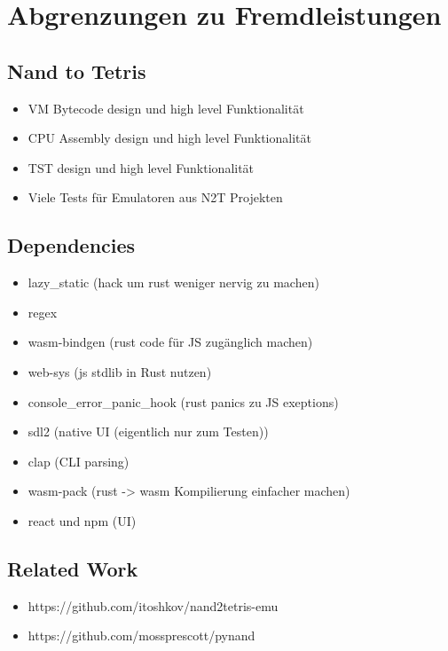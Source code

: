 \section{Abgrenzungen zu Fremdleistungen}

\subsection{Nand to Tetris}
\begin{itemize}
  \item VM Bytecode design und high level Funktionalität
  \item CPU Assembly design und high level Funktionalität
  \item TST design und high level Funktionalität
  \item Viele Tests für Emulatoren aus N2T Projekten
\end{itemize}

\subsection{Dependencies}
\begin{itemize}
\item lazy\_static (hack um rust weniger nervig zu machen)
\item regex
\item wasm-bindgen (rust code für JS zugänglich machen)
\item web-sys (js stdlib in Rust nutzen)
\item console\_error\_panic\_hook (rust panics zu JS exeptions)
\item sdl2 (native UI (eigentlich nur zum Testen))
\item clap (CLI parsing)
\item wasm-pack (rust -> wasm Kompilierung einfacher machen)
\item react und npm (UI)
\end{itemize}

\subsection{Related Work}
\begin{itemize}
  \item https://github.com/itoshkov/nand2tetris-emu
  \item https://github.com/mossprescott/pynand
\end{itemize}
